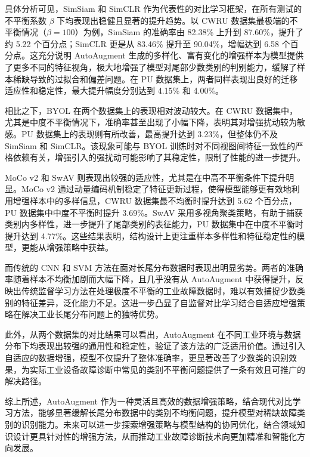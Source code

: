 \documentclass[master]{thesis-uestc}
\begin{document}
具体分析可见，SimSiam 和 SimCLR 作为代表性的对比学习框架，在所有测试的不平衡系数 $\beta$ 下均表现出稳健且显著的提升趋势。以 CWRU 数据集最极端的不平衡情况（$\beta=100$）为例，SimSiam 的准确率由 82.38\% 上升到 87.60\%，提升了约 5.22 个百分点；SimCLR 更是从 83.46\% 提升至 90.04\%，增幅达到 6.58 个百分点。这充分说明 AutoAugment 生成的多样化、富有变化的增强样本为模型提供了更多不同的特征视角，极大地增强了模型对尾部少数类别的判别能力，缓解了样本稀缺导致的过拟合和偏差问题。在 PU 数据集上，两者同样表现出良好的迁移适应性和稳定性，最大提升幅度分别达到 4.15\% 和 4.00\%。

相比之下，BYOL 在两个数据集上的表现相对波动较大。在 CWRU 数据集中，尤其是中度不平衡情况下，准确率甚至出现了小幅下降，表明其对增强扰动较为敏感。PU 数据集上的表现则有所改善，最高提升达到 3.23\%，但整体仍不及 SimSiam 和 SimCLR。该现象可能与 BYOL 训练时对不同视图间特征一致性的严格依赖有关，增强引入的强扰动可能影响了其稳定性，限制了性能的进一步提升。

MoCo v2 和 SwAV 则表现出较强的适应性，尤其是在中高不平衡条件下提升明显。MoCo v2 通过动量编码机制稳定了特征更新过程，使得模型能够更有效地利用增强样本中的多样信息，CWRU 数据集最不均衡时提升达到 5.62 个百分点，PU 数据集中中度不平衡时提升 3.69\%。SwAV 采用多视角聚类策略，有助于捕获类别内多样性，进一步提升了尾部类别的表征能力，PU 数据集中在中度不平衡时提升达到 4.77\%。这些结果表明，结构设计上更注重样本多样性和特征稳定性的模型，更能从增强策略中获益。

而传统的 CNN 和 SVM 方法在面对长尾分布数据时表现出明显劣势。两者的准确率随着样本不均衡加剧而大幅下降，且几乎没有从 AutoAugment 中获得提升，反映出传统监督学习方法在处理极度不平衡的工业故障数据时，难以有效捕捉少数类别的特征差异，泛化能力不足。这进一步凸显了自监督对比学习结合自适应增强策略在解决工业长尾分布问题上的独特优势。

此外，从两个数据集的对比结果可以看出，AutoAugment 在不同工业环境与数据分布下均表现出较强的通用性和稳定性，验证了该方法的广泛适用价值。通过引入自适应的数据增强，模型不仅提升了整体准确率，更显著改善了少数类的识别效果，为实际工业设备故障诊断中常见的类别不平衡问题提供了一条有效且可推广的解决路径。

综上所述，AutoAugment 作为一种灵活且高效的数据增强策略，结合现代对比学习方法，能够显著缓解长尾分布数据中的类别不均衡问题，提升模型对稀缺故障类别的识别能力。未来可以进一步探索增强策略与模型结构的协同优化，结合领域知识设计更具针对性的增强方法，从而推动工业故障诊断技术向更加精准和智能化方向发展。
\end{document}
